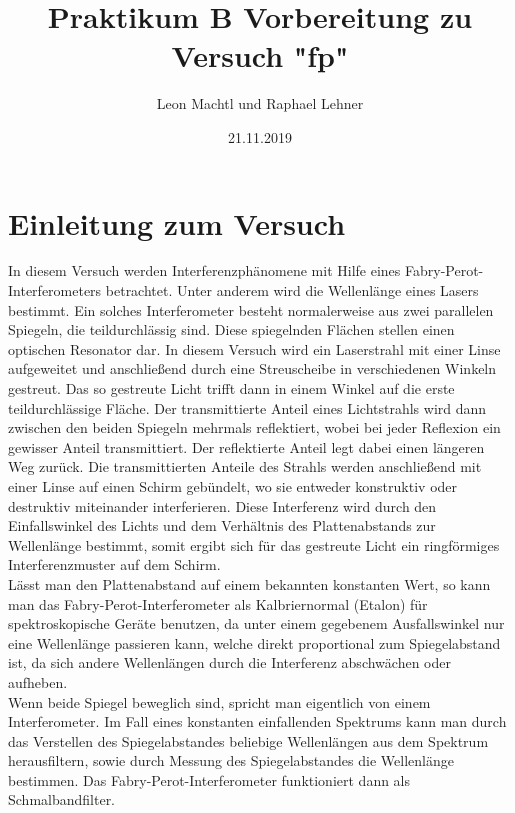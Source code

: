 \documentclass[a4paper,10pt]{scrartcl}
\title{Praktikum B Vorbereitung zu Versuch "fp"}
\author{Leon Machtl und Raphael Lehner}
\date{21.11.2019}
\begin{document}
	\maketitle
	\tableofcontents
	\newpage
	
	\section{Einleitung zum Versuch}
	In diesem Versuch werden Interferenzphänomene mit Hilfe eines Fabry-Perot-Interferometers betrachtet. Unter anderem wird die Wellenlänge eines Lasers bestimmt. Ein solches Interferometer besteht normalerweise aus zwei parallelen Spiegeln, die teildurchlässig sind. Diese spiegelnden Flächen stellen einen optischen Resonator dar. In diesem Versuch wird ein Laserstrahl mit einer Linse aufgeweitet und anschließend durch eine Streuscheibe in verschiedenen Winkeln gestreut. Das so gestreute Licht trifft dann in einem Winkel auf die erste teildurchlässige Fläche. Der transmittierte Anteil eines Lichtstrahls wird dann zwischen den beiden Spiegeln mehrmals reflektiert, wobei bei jeder Reflexion ein gewisser Anteil transmittiert. Der reflektierte Anteil legt dabei einen längeren Weg zurück. Die transmittierten Anteile des Strahls werden anschließend mit einer Linse auf einen Schirm gebündelt, wo sie entweder konstruktiv oder destruktiv miteinander interferieren. Diese Interferenz wird durch den Einfallswinkel des Lichts und dem Verhältnis des Plattenabstands zur Wellenlänge bestimmt, somit ergibt sich für das gestreute Licht ein ringförmiges Interferenzmuster auf dem Schirm. \\
	Lässt man den Plattenabstand auf einem bekannten konstanten Wert, so kann man das Fabry-Perot-Interferometer als Kalbriernormal (Etalon) für spektroskopische Geräte benutzen, da unter einem gegebenem Ausfallswinkel nur eine Wellenlänge passieren kann, welche direkt proportional zum Spiegelabstand ist, da sich andere Wellenlängen durch die Interferenz abschwächen oder aufheben.\\
	Wenn beide Spiegel beweglich sind, spricht man eigentlich von einem Interferometer. Im Fall eines konstanten einfallenden Spektrums kann man durch das Verstellen des Spiegelabstandes beliebige Wellenlängen aus dem Spektrum herausfiltern, sowie durch Messung des Spiegelabstandes die Wellenlänge bestimmen. Das Fabry-Perot-Interferometer funktioniert dann als Schmalbandfilter.
	
\end{document}
